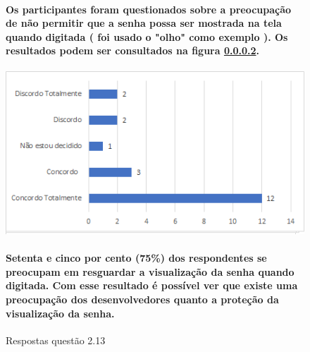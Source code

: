 \begin{figure}[!t]
\centering
\paragraph{Os participantes foram questionados sobre a preocupação de não permitir que a senha possa ser mostrada na tela quando digitada ( foi usado o "olho" como exemplo ). Os resultados podem ser consultados na figura \ref{fig:2.13}. 
}
\includegraphics[scale=0.7]{figuras das questoes/2.13.png}
\caption{Respostas questão 2.13}

\paragraph{
Setenta e cinco por cento (75{\%}) dos respondentes se preocupam em resguardar a visualização da senha quando digitada.  Com esse resultado é possível  ver que existe uma preocupação dos desenvolvedores quanto a proteção da visualização da senha.
}
\label{fig:2.13}
\end{figure}


